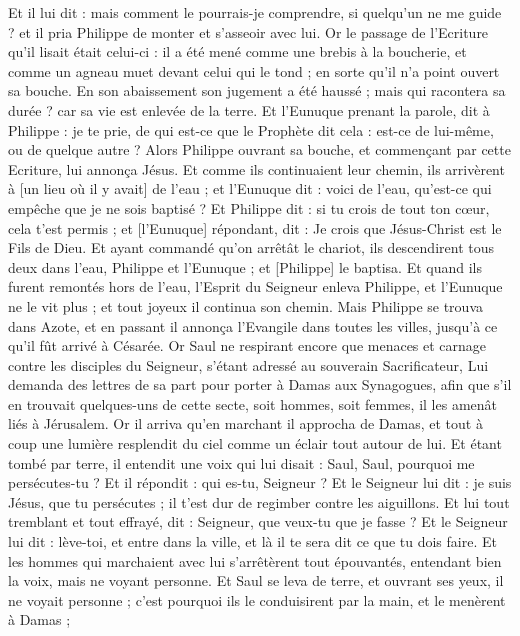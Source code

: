 \begin{multicols}{2}
Et il lui dit : mais comment le pourrais-je comprendre, si quelqu'un ne me guide ? et il pria Philippe de monter et s'asseoir avec lui.
Or le passage de l'Ecriture qu'il lisait était celui-ci : il a été mené comme une brebis à la boucherie, et comme un agneau muet devant celui qui le tond ; en sorte qu'il n'a point ouvert sa bouche.
En son abaissement son jugement a été haussé ; mais qui racontera sa durée ? car sa vie est enlevée de la terre.
Et l'Eunuque prenant la parole, dit à Philippe : je te prie, de qui est-ce que le Prophète dit cela : est-ce de lui-même, ou de quelque autre ?
Alors Philippe ouvrant sa bouche, et commençant par cette Ecriture, lui annonça Jésus.
Et comme ils continuaient leur chemin, ils arrivèrent à [un lieu où il y avait] de l'eau ; et l'Eunuque dit : voici de l'eau, qu'est-ce qui empêche que je ne sois baptisé ?
Et Philippe dit : si tu crois de tout ton cœur, cela t'est permis ; et [l'Eunuque] répondant, dit : Je crois que Jésus-Christ est le Fils de Dieu.
Et ayant commandé qu'on arrêtât le chariot, ils descendirent tous deux dans l'eau, Philippe et l'Eunuque ; et [Philippe] le baptisa.
Et quand ils furent remontés hors de l'eau, l'Esprit du Seigneur enleva Philippe, et l'Eunuque ne le vit plus ; et tout joyeux il continua son chemin.
Mais Philippe se trouva dans Azote, et en passant il annonça l'Evangile dans toutes les villes, jusqu'à ce qu'il fût arrivé à Césarée.
\VerseOne{}Or Saul ne respirant encore que menaces et carnage contre les disciples du Seigneur, s'étant adressé au souverain Sacrificateur,
Lui demanda des lettres de sa part pour porter à Damas aux Synagogues, afin que s'il en trouvait quelques-uns de cette secte, soit hommes, soit femmes, il les amenât liés à Jérusalem.
Or il arriva qu'en marchant il approcha de Damas, et tout à coup une lumière resplendit du ciel comme un éclair tout autour de lui.
Et étant tombé par terre, il entendit une voix qui lui disait : Saul, Saul, pourquoi me persécutes-tu ?
Et il répondit : qui es-tu, Seigneur ? Et le Seigneur lui dit : je suis Jésus, que tu persécutes ; il t'est dur de regimber contre les aiguillons.
Et lui tout tremblant et tout effrayé, dit : Seigneur, que veux-tu que je fasse ? Et le Seigneur lui dit : lève-toi, et entre dans la ville, et là il te sera dit ce que tu dois faire.
Et les hommes qui marchaient avec lui s'arrêtèrent tout épouvantés, entendant bien la voix, mais ne voyant personne.
Et Saul se leva de terre, et ouvrant ses yeux, il ne voyait personne ; c'est pourquoi ils le conduisirent par la main, et le menèrent à Damas ;

\end{multicols}
